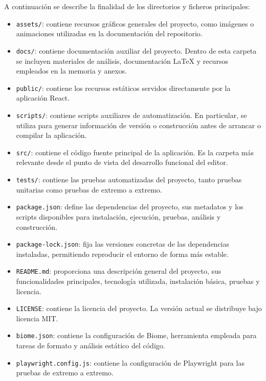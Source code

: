 A continuación se describe la finalidad de los directorios y ficheros principales:

\begin{itemize}
\item \texttt{assets/}: contiene recursos gráficos generales del proyecto, como imágenes o animaciones utilizadas en la documentación del repositorio.

\item \texttt{docs/}: contiene documentación auxiliar del proyecto. Dentro de esta carpeta se incluyen materiales de análisis, documentación \LaTeX{} y recursos empleados en la memoria y anexos.

\item \texttt{public/}: contiene los recursos estáticos servidos directamente por la aplicación React.

\item \texttt{scripts/}: contiene scripts auxiliares de automatización. En particular, se utiliza para generar información de versión o construcción antes de arrancar o compilar la aplicación.

\item \texttt{src/}: contiene el código fuente principal de la aplicación. Es la carpeta más relevante desde el punto de vista del desarrollo funcional del editor.

\item \texttt{tests/}: contiene las pruebas automatizadas del proyecto, tanto pruebas unitarias como pruebas de extremo a extremo.

\item \texttt{package.json}: define las dependencias del proyecto, sus metadatos y los scripts disponibles para instalación, ejecución, pruebas, análisis y construcción.

\item \texttt{package-lock.json}: fija las versiones concretas de las dependencias instaladas, permitiendo reproducir el entorno de forma más estable.

\item \texttt{README.md}: proporciona una descripción general del proyecto, sus funcionalidades principales, tecnología utilizada, instalación básica, pruebas y licencia.

\item \texttt{LICENSE}: contiene la licencia del proyecto. La versión actual se distribuye bajo licencia MIT.

\item \texttt{biome.json}: contiene la configuración de Biome, herramienta empleada para tareas de formato y análisis estático del código.

\item \texttt{playwright.config.js}: contiene la configuración de Playwright para las pruebas de extremo a extremo.

\end{itemize}

